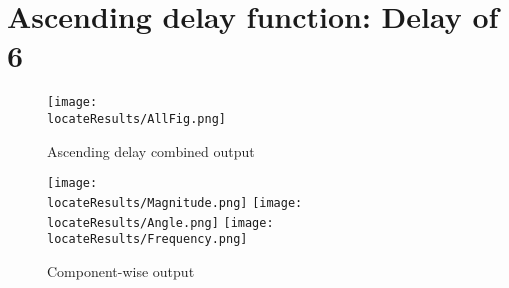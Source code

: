 \newpage

\section{Ascending delay function: Delay of 6}
\begin{figure}[hb]
    \texttt{[image: \\locateResults/AllFig.png]}    
    \caption{Ascending delay combined output}
    \label{fig:PMUsim-Asc6-allfig}
\end{figure}


     \begin{figure}
        \caption{Component-wise output}
 
    \texttt{[image: \\locateResults/Magnitude.png]}    
         \label{fig:PMUsim-Asc6Mag}
   \texttt{[image: \\locateResults/Angle.png]}    
         \label{fig:PMUsim-Asc6Ang}
   \texttt{[image: \\locateResults/Frequency.png]}    
         \label{fig:PMUsim-Asc6Freq}
 
\end{figure}



